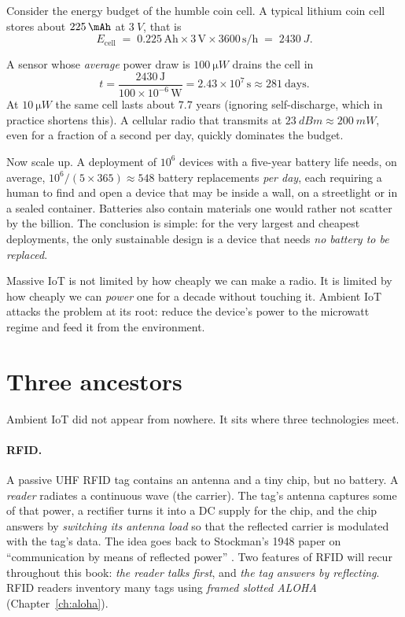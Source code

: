 Consider the energy budget of the humble coin cell. A typical lithium coin
cell stores about $\SI{225}{\mAh}$ at $\SI{3}{V}$, that is
\[
 E_{\mathrm{cell}} \;=\; 0.225\,\mathrm{Ah}\times 3\,\mathrm{V}\times 3600\,\mathrm{s/h}
 \;=\; \SI{2430}{J}.
\]
\begin{example}
A sensor whose \emph{average} power draw is $\SI{100}{\micro W}$ drains the cell in
\[
 t=\frac{2430\,\mathrm{J}}{100\times10^{-6}\,\mathrm{W}}=2.43\times10^{7}\,\mathrm{s}\approx 281\ \text{days}.
\]
At $\SI{10}{\micro W}$ the same cell lasts about $7.7$ years (ignoring
self-discharge, which in practice shortens this). A cellular radio that
transmits at $\SI{23}{dBm}\approx\SI{200}{mW}$, even for a fraction of a
second per day, quickly dominates the budget.
\end{example}
Now scale up. A deployment of $10^{6}$ devices with a five-year battery life
needs, on average, $10^{6}/(5\times365)\approx 548$ battery replacements \emph{per
day}, each requiring a human to find and open a device that may be inside a
wall, on a streetlight or in a sealed container. Batteries also contain
materials one would rather not scatter by the billion. The conclusion is
simple: for the very largest and cheapest deployments, the only sustainable
design is a device that needs \emph{no battery to be replaced}.

\begin{keyidea}
Massive IoT is not limited by how cheaply we can make a radio. It is limited by
how cheaply we can \emph{power} one for a decade without touching it. Ambient
IoT attacks the problem at its root: reduce the device's power to the
microwatt regime and feed it from the environment.
\end{keyidea}

\section{Three ancestors}
\label{sec:ancestors}

Ambient IoT did not appear from nowhere. It sits where three technologies
meet.

\paragraph{RFID.}
A passive UHF RFID tag contains an antenna and a tiny chip, but no battery. A
\emph{reader} radiates a continuous wave (the carrier). The tag's antenna
captures some of that power, a rectifier turns it into a DC supply for the chip,
and the chip answers by \emph{switching its antenna load} so that the
reflected carrier is modulated with the tag's data. The idea goes back to
Stockman's 1948 paper on ``communication by means of reflected power''
\citep{stockman1948}. Two features of RFID will recur throughout this book:
\emph{the reader talks first}, and \emph{the tag answers by reflecting}. RFID
readers inventory many tags using \emph{framed slotted ALOHA} (Chapter~\ref{ch:aloha}).

